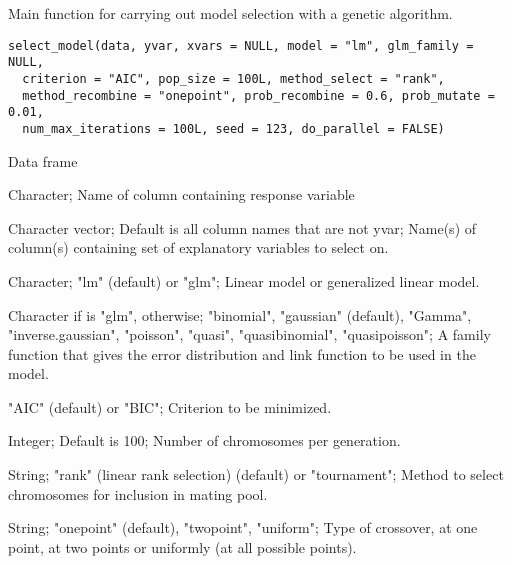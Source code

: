 %
\begin{Description}\relax
Main function for carrying out model selection with a genetic algorithm.
\end{Description}
%
\begin{Usage}
\begin{verbatim}
select_model(data, yvar, xvars = NULL, model = "lm", glm_family = NULL,
  criterion = "AIC", pop_size = 100L, method_select = "rank",
  method_recombine = "onepoint", prob_recombine = 0.6, prob_mutate = 0.01,
  num_max_iterations = 100L, seed = 123, do_parallel = FALSE)
\end{verbatim}
\end{Usage}
%
\begin{Arguments}
\begin{ldescription}
\item[\code{data}] Data frame

\item[\code{yvar}] Character; Name of column containing response variable

\item[\code{xvars}] Character vector; Default is all column names that are not yvar;
Name(s) of column(s) containing set of explanatory variables to select on.

\item[\code{model}] Character; "lm" (default) or "glm"; Linear model or
generalized linear model.

\item[\code{glm\_family}] Character if  is "glm",  otherwise;
"binomial", "gaussian" (default), "Gamma", "inverse.gaussian", "poisson", "quasi",
"quasibinomial", "quasipoisson"; A family function that gives the error
distribution and link function to be used in the model.

\item[\code{criterion}] "AIC" (default) or "BIC"; Criterion to be minimized.

\item[\code{pop\_size}] Integer; Default is 100; Number of chromosomes per generation.

\item[\code{method\_select}] String; "rank" (linear rank selection) (default) or
"tournament"; Method to select chromosomes for inclusion in mating pool.

\item[\code{method\_recombine}] String; "onepoint" (default), "twopoint", "uniform";
Type of crossover, at one point, at two points or uniformly (at all possible points).


\end{ldescription}
\end{Arguments}
